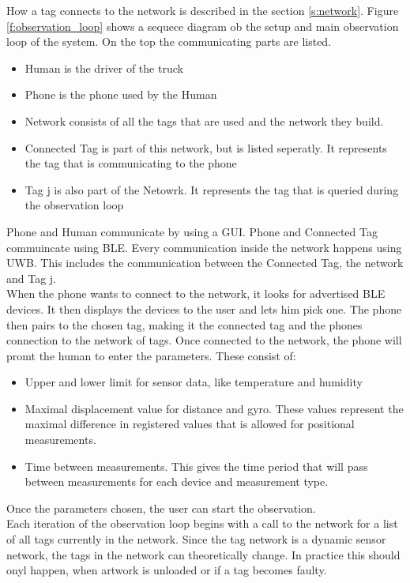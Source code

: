 How a tag connects to the network is described in the section \ref{s:network}.
Figure \ref{f:observation_loop} shows a sequece diagram ob the setup and main observation loop of the system.
On the top the communicating parts are listed.
\begin{itemize}
 \item Human is the driver of the truck
 \item Phone is the phone used by the Human
 \item Network consists of all the tags that are used and the network they build.
 \item Connected Tag is part of this network, but is listed seperatly. It represents the tag that is communicating to the phone
 \item Tag j is also part of the Netowrk. It represents the tag that is queried during the observation loop
\end{itemize}
Phone and Human communicate by using a GUI. Phone and Connected Tag commuincate using BLE. Every communication inside the network happens using UWB. This includes the communication between the Connected Tag, the network and Tag j. \\
When the phone wants to connect to the network, it looks for advertised BLE devices.
It then displays the devices to the user and lets him pick one.
The phone then pairs to the chosen tag, making it the connected tag and the phones connection to the network of tags.
Once connected to the network, the phone will promt the human to enter the parameters.
These consist of:
\begin{itemize}
 \item Upper and lower limit for sensor data, like temperature and humidity
 \item Maximal displacement value for distance and gyro. These values represent the maximal difference in registered values that is allowed for positional measurements.
 \item Time between measurements. This gives the time period that will pass between measurements for each device and measurement type.
\end{itemize}
Once the parameters chosen, the user can start the observation.\\
Each iteration of the observation loop begins with a call to the network for a list of all tags currently in the network.
Since the tag network is a dynamic sensor network, the tags in the network can theoretically change. 
In practice this should onyl happen, when artwork is unloaded or if a tag becomes faulty.
